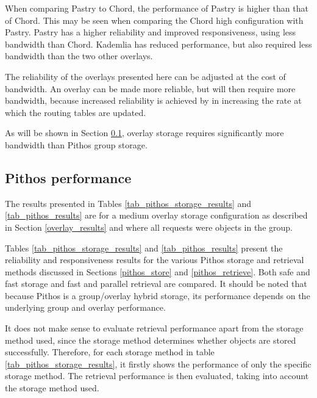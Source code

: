 When comparing Pastry to Chord, the performance of Pastry is higher than that of Chord. This may be seen when comparing the Chord high configuration with Pastry. Pastry has a higher reliability and improved responsiveness, using less bandwidth than Chord. Kademlia has reduced performance, but also required less bandwidth than the two other overlays.

The reliability of the overlays presented here can be adjusted at the cost of bandwidth. An overlay can be made more reliable, but will then require more bandwidth, because increased reliability is achieved by in increasing the rate at which the routing tables are updated.

As will be shown in Section \ref{pithos_resp_rel_results}, overlay storage requires significantly more bandwidth than Pithos group storage.

\subsection{Pithos performance}
\label{pithos_resp_rel_results}

The results presented in Tables \ref{tab_pithos_storage_results} and \ref{tab_pithos_results} are for a medium overlay storage configuration as described in Section \ref{overlay_results} and where all requests were objects in the group.

Tables \ref{tab_pithos_storage_results} and \ref{tab_pithos_results} present the reliability and responsiveness results for the various Pithos storage and retrieval methods discussed in Sections \ref{pithos_store} and \ref{pithos_retrieve}. Both safe and fast storage and fast and parallel retrieval are compared. It should be noted that because Pithos is a group/overlay hybrid storage, its performance depends on the underlying group and overlay performance.

It does not make sense to evaluate retrieval performance apart from the storage method used, since the storage method determines whether objects are stored successfully. Therefore, for each storage method in table \ref{tab_pithos_storage_results}, it firstly shows the performance of only the specific storage method. The retrieval performance is then evaluated, taking into account the storage method used.

